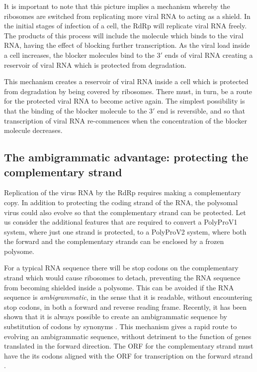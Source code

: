 \documentclass[12pt]{iopart}
\begin{document}
It is important to note that this picture implies a mechanism whereby the ribosomes are switched 
from replicating more viral RNA to acting as a shield. In the initial stages of infection of a cell, the RdRp 
will replicate viral RNA freely. The products of this process will include the molecule which binds to the 
viral RNA, having the effect of blocking further transcription. As the viral load inside a cell increases, the 
blocker molecules bind to the $3'$ ends of viral RNA creating a reservoir of viral RNA which is protected 
from degradation. 

This mechanism creates a reservoir of viral RNA inside a cell which is protected from degradation by being 
covered by ribosomes. There must, in turn, be a route for the protected viral RNA to become active again. The simplest 
possibility is that the binding of the blocker molecule to the $3'$ end is reversible, and so that transcription 
of viral RNA re-commences when the concentration of the blocker molecule decreases.

\subsection{The ambigrammatic advantage: protecting the complementary strand}
\label{sec: 2.2}

Replication of the virus RNA by the RdRp requires making a complementary copy. 
In addition to protecting the coding strand of the RNA, the polysomal virus could 
also evolve so that the complementary strand can be protected. Let us consider the additional 
features that are required to convert a PolyProV1 system, where just one strand is protected, 
to a PolyProV2 system, where both the forward and the complementary strands can be 
enclosed by a frozen polysome.

For a typical RNA sequence there will be stop codons on the complementary strand which 
would cause ribosomes to detach, preventing the RNA sequence from becoming shielded 
inside a polysome. This can be avoided if the RNA sequence is \emph{ambigrammatic}, 
in the sense that it is readable, without encountering stop codons, in both a forward and reverse 
reading frame. Recently, it has been shown that it is always possible to create an ambigrammatic sequence 
by substitution of codons by synonyms \cite{DeR+19}. This mechanism gives a rapid route to 
evolving an ambigrammatic sequence, without detriment to the function of 
genes translated in the forward direction. The ORF for the complementary strand 
must have the its codons aligned with the ORF for transcription on the forward strand \cite{DeR+19}.
\end{document}
